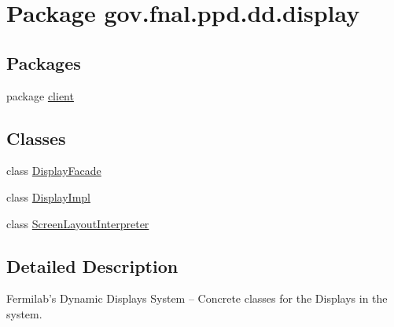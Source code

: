 \hypertarget{namespacegov_1_1fnal_1_1ppd_1_1dd_1_1display}{\section{Package gov.\-fnal.\-ppd.\-dd.\-display}
\label{namespacegov_1_1fnal_1_1ppd_1_1dd_1_1display}
}
\subsection*{Packages}
\begin{DoxyCompactItemize}
\item 
package \hyperlink{namespacegov_1_1fnal_1_1ppd_1_1dd_1_1display_1_1client}{client}
\end{DoxyCompactItemize}
\subsection*{Classes}
\begin{DoxyCompactItemize}
\item 
class \hyperlink{classgov_1_1fnal_1_1ppd_1_1dd_1_1display_1_1DisplayFacade}{Display\-Facade}
\item 
class \hyperlink{classgov_1_1fnal_1_1ppd_1_1dd_1_1display_1_1DisplayImpl}{Display\-Impl}
\item 
class \hyperlink{classgov_1_1fnal_1_1ppd_1_1dd_1_1display_1_1ScreenLayoutInterpreter}{Screen\-Layout\-Interpreter}
\end{DoxyCompactItemize}


\subsection{Detailed Description}
Fermilab's Dynamic Displays System -- Concrete classes for the Displays in the system.